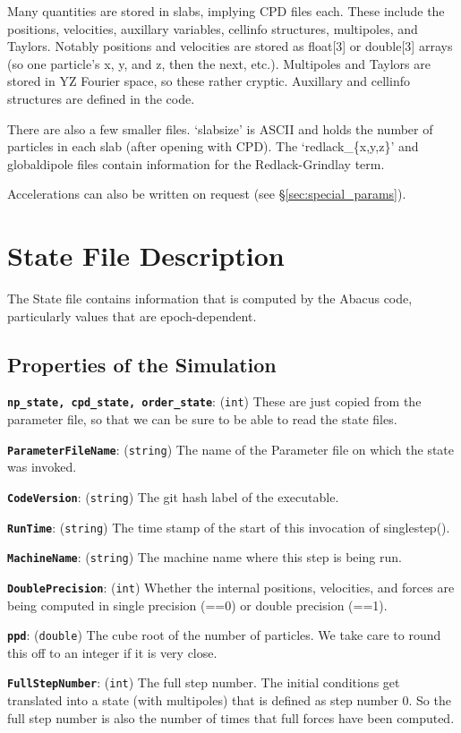 \documentclass[11pt,preprint]{aastex}
\newcommand{\param}[2]{\medskip\noindent\textbf{\texttt{#1}}: ({\tt #2}) }
\begin{document}
Many quantities are stored in slabs, implying CPD files each.  These
include the positions, velocities, auxillary variables, cellinfo
structures, multipoles, and Taylors.  Notably positions and velocities
are stored as float[3] or double[3] arrays (so one particle's x,
y, and z, then the next, etc.).  Multipoles and Taylors are stored
in YZ Fourier space, so these rather cryptic.  Auxillary and cellinfo
structures are defined in the code.

There are also a few smaller files.  `slabsize' is ASCII and holds
the number of particles in each slab (after opening with CPD).  The
`redlack\_\{x,y,z\}' and globaldipole files contain information for
the Redlack-Grindlay term.

Accelerations can also be written on request (see \S\ref{sec:special_params}).

\section{State File Description}

The State file contains information that is computed by the Abacus
code, particularly values that are epoch-dependent.

\subsection{Properties of the Simulation}

\param{np\_state, cpd\_state, order\_state}{int} These are just
copied from the parameter file, so that we can be sure to be able
to read the state files.

\param{ParameterFileName}{string} The name of the Parameter file
on which the state was invoked.

\param{CodeVersion}{string} The git hash label of the executable.

\param{RunTime}{string} The time stamp of the start of this invocation
of singlestep().

\param{MachineName}{string} The machine name where this step is
being run.

\param{DoublePrecision}{int} Whether the internal positions,
velocities, and forces are being computed in single precision (==0)
or double precision (==1).

\param{ppd}{double} The cube root of the number of particles.  We
take care to round this off to an integer if it is very close.

\param{FullStepNumber}{int} The full step number.  The initial
conditions get translated into a state (with multipoles) that is
defined as step number 0.  So the full step number is also the
number of times that full forces have been computed.
\end{document}
